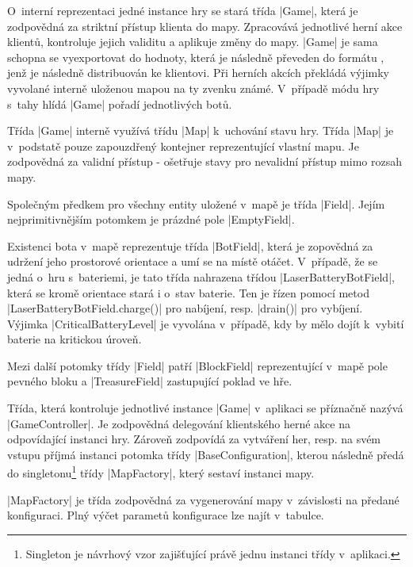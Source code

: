 O~interní reprezentaci jedné instance hry se stará třída \ic|Game|, která je zodpovědná za striktní přístup klienta do mapy. Zpracovává jednotlivé herní akce klientů, kontroluje jejich validitu a aplikuje změny do mapy. \ic|Game| je sama schopna se vyexportovat do hodnoty, která je následně převeden do formátu , jenž je následně distribuován ke klientovi. Při herních akcích překládá výjimky vyvolané interně uloženou mapou na ty zvenku známé. V~případě módu hry s~tahy hlídá \ic|Game| pořadí jednotlivých botů.

Třída \ic|Game| interně využívá třídu \ic|Map| k~uchování stavu hry. Třída \ic|Map| je v~podstatě pouze zapouzdřený kontejner reprezentující vlastní mapu. Je zodpovědná za validní přístup - ošetřuje stavy pro nevalidní přístup mimo rozsah mapy.

Společným předkem pro všechny entity uložené v~mapě je třída \ic|Field|. Jejím nejprimitivnějším potomkem je prázdné pole \ic|EmptyField|.

\begin{sloppypar}
	Existenci bota v~mapě reprezentuje třída \ic|BotField|, která je zopovědná za udržení jeho prostorové orientace a umí se na místě otáčet. V~případě, že se jedná o~hru s~bateriemi, je tato třída nahrazena třídou \ic|LaserBatteryBotField|, která se kromě orientace stará i o~stav baterie. Ten je řízen pomocí metod \ic|LaserBatteryBotField.charge()| pro nabíjení, resp. \ic|drain()| pro vybíjení. Výjimka \ic|CriticalBatteryLevel| je vyvolána v~případě, kdy by mělo dojít k~vybití baterie na kritickou úroveň.
\end{sloppypar}

Mezi další potomky třídy \ic|Field| patří \ic|BlockField| reprezentující v~mapě pole pevného bloku a \ic|TreasureField| zastupující poklad ve hře.

Třída, která kontroluje jednotlivé instance \ic|Game| v~aplikaci se příznačně nazývá \ic|GameController|. Je zodpovědná delegování klientského herné akce na odpovídající instanci hry. Zároveň zodpovídá za vytváření her, resp. na svém vstupu příjmá instanci potomka třídy \ic|BaseConfiguration|, kterou následně předá do singletonu\footnote{Singleton je návrhový vzor zajišťující právě jednu instanci třídy v~aplikaci.} třídy \ic|MapFactory|, který sestaví instanci mapy.

\ic|MapFactory| je třída zodpovědná za vygenerování mapy v~závislosti na předané konfiguraci. Plný výčet parametů konfigurace lze najít v~tabulce.

